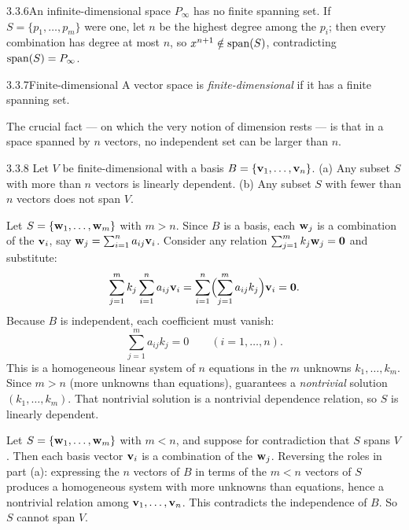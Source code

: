 \begin{exmp}{3.3.6}{An infinite-dimensional space}
$P_\infty$ has no finite spanning set. If $S=\{p_1,\dots,p_m\}$ were one, let $n$ be the highest degree among the $p_i$; then every combination has degree at most $n$, so $x^{n+1}\notin\operatorname{span}(S)$, contradicting $\operatorname{span}(S)=P_\infty$.
\end{exmp}

\begin{defns}{3.3.7}{Finite-dimensional}
A vector space is \emph{finite-dimensional} if it has a finite spanning set.
\end{defns}

The crucial fact --- on which the very notion of dimension rests --- is that in a space spanned by $n$ vectors, no independent set can be larger than $n$.

\begin{thms}{3.3.8}{}
Let $V$ be finite-dimensional with a basis $B=\{\mathbf{v}_1,\dots,\mathbf{v}_n\}$.
\textup{(a)} Any subset $S$ with more than $n$ vectors is linearly dependent.
\textup{(b)} Any subset $S$ with fewer than $n$ vectors does not span $V$.
\end{thms}

\begin{prf}
 Let $S=\{\mathbf{w}_1,\dots,\mathbf{w}_m\}$ with $m>n$. Since $B$ is a basis, each $\mathbf{w}_j$ is a combination of the $\mathbf{v}_i$, say $\mathbf{w}_j=\sum_{i=1}^n a_{ij}\mathbf{v}_i$. Consider any relation $\sum_{j=1}^m k_j\mathbf{w}_j=\mathbf{0}$ and substitute:
\[
\sum_{j=1}^m k_j\sum_{i=1}^n a_{ij}\mathbf{v}_i=\sum_{i=1}^n\Bigl(\sum_{j=1}^m a_{ij}k_j\Bigr)\mathbf{v}_i=\mathbf{0}.
\]
Because $B$ is independent, each coefficient must vanish:
\[
\sum_{j=1}^m a_{ij}k_j=0\qquad(i=1,\dots,n).
\]
This is a homogeneous linear system of $n$ equations in the $m$ unknowns $k_1,\dots,k_m$. Since $m>n$ (more unknowns than equations),  guarantees a \emph{nontrivial} solution $(k_1,\dots,k_m)$. That nontrivial solution is a nontrivial dependence relation, so $S$ is linearly dependent.

 Let $S=\{\mathbf{w}_1,\dots,\mathbf{w}_m\}$ with $m<n$, and suppose for contradiction that $S$ spans $V$. Then each basis vector $\mathbf{v}_i$ is a combination of the $\mathbf{w}_j$. Reversing the roles in part (a): expressing the $n$ vectors of $B$ in terms of the $m<n$ vectors of $S$ produces a homogeneous system with more unknowns than equations, hence a nontrivial relation among $\mathbf{v}_1,\dots,\mathbf{v}_n$. This contradicts the independence of $B$. So $S$ cannot span $V$.
\end{prf}

